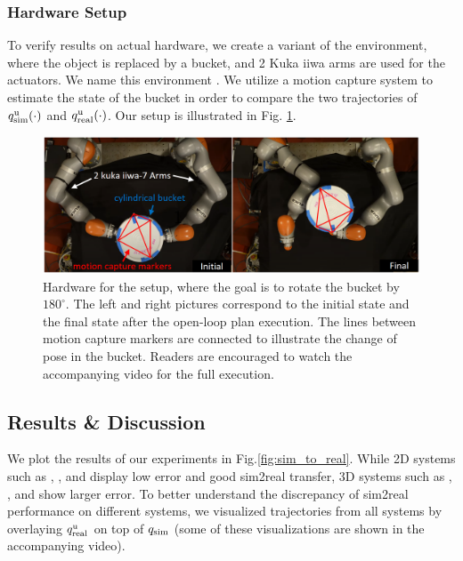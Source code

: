 \subsubsection{Hardware Setup}
To verify results on actual hardware, we create a variant of the  environment, where the object is replaced by a bucket, and 2 Kuka iiwa arms are used for the actuators. We name this environment . We utilize a motion capture system to estimate the state of the bucket in order to compare the two trajectories of $q^\mathrm{u}_{\mathrm{sim}}(\cdot)$ and $q^\mathrm{u}_{\mathrm{real}}(\cdot)$. Our setup is illustrated in Fig. \ref{fig:hardware}.

\begin{figure}[thpb]
\centering\includegraphics[width = 1.0\linewidth]{figures/03_contact_rich_planning/hardware_setup.png}
\caption{Hardware for the  setup, where the goal is to rotate the bucket by $180^\circ$. The left and right pictures correspond to the initial state and the final state after the open-loop plan execution. The lines between motion capture markers are connected to illustrate the change of pose in the bucket. Readers are encouraged to watch the accompanying video for the full execution.} 
\label{fig:hardware}
\end{figure}


\subsection{Results \& Discussion}
We plot the results of our experiments in Fig.\ref{fig:sim_to_real}. While 2D systems such as , , and  display low error and good sim2real transfer, 3D systems such as , ,  and  show larger error. To better understand the discrepancy of sim2real performance on different systems, we visualized trajectories from all systems by overlaying $q^\mathrm{u}_{\mathrm{real}}$ on top of $q_{\mathrm{sim}}$ (some of these visualizations are shown in the accompanying video). 

